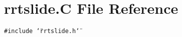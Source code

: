 \section{rrtslide.C File Reference}
\label{rrtslide_C}
{\tt \#include \char`\"{}rrtslide.h\char`\"{}}\par
